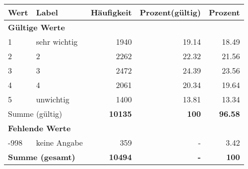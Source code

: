      \begin{longtable}{lXrrr}
     \toprule
     \textbf{Wert} & \textbf{Label} & \textbf{Häufigkeit} & \textbf{Prozent(gültig)} & \textbf{Prozent} \\
     \endhead
     \midrule
     \multicolumn{5}{l}{\textbf{Gültige Werte}}\\

     1 &
     \multicolumn{1}{X}{ sehr wichtig   } &


       \num{1940} &
       \num[round-mode=places,round-precision=2]{19.14} &
         \num[round-mode=places,round-precision=2]{18.49} \\

     2 &
     \multicolumn{1}{X}{ 2   } &


       \num{2262} &
       \num[round-mode=places,round-precision=2]{22.32} &
         \num[round-mode=places,round-precision=2]{21.56} \\

     3 &
     \multicolumn{1}{X}{ 3   } &


       \num{2472} &
       \num[round-mode=places,round-precision=2]{24.39} &
         \num[round-mode=places,round-precision=2]{23.56} \\

     4 &
     \multicolumn{1}{X}{ 4   } &


       \num{2061} &
       \num[round-mode=places,round-precision=2]{20.34} &
         \num[round-mode=places,round-precision=2]{19.64} \\

     5 &
     \multicolumn{1}{X}{ unwichtig   } &


       \num{1400} &
       \num[round-mode=places,round-precision=2]{13.81} &
         \num[round-mode=places,round-precision=2]{13.34} \\
     \midrule
     \multicolumn{2}{l}{Summe (gültig)} &
       \textbf{\num{10135}} &
     \textbf{\num{100}} &
       \textbf{\num[round-mode=places,round-precision=2]{96.58}} \\
     \multicolumn{5}{l}{\textbf{Fehlende Werte}}\\
       -998 &
       keine Angabe &
         \num{359} &
        - &
         \num[round-mode=places,round-precision=2]{3.42} \\
     \midrule
     \multicolumn{2}{l}{\textbf{Summe (gesamt)}} &
          \textbf{\num{10494}} &
        \textbf{-} &
        \textbf{\num{100}} \\
     \bottomrule
     \end{longtable}
     

